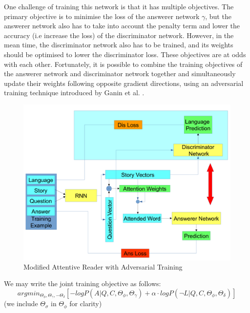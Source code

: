 \documentclass[]{article}
\begin{document}
One challenge of training this network is that it has multiple objectives. The primary objective is to minimise the loss of the answerer network $\gamma$, but the answerer network also has to take into account the penalty term and lower the accuracy (i.e increase the loss) of the discriminator network. However, in the mean time, the discriminator network also has to be trained, and its weights should be optimised to lower the discriminator loss. These objectives are at odds with each other. Fortunately, it is possible to combine the training objectives of the answerer network and discriminator network together and simultaneously update their weights following opposite gradient directions, using an adversarial training technique introduced by Ganin et al. \cite{ganin2016domain}.

\begin{center}
	\begin{figure}
		\includegraphics[width=\linewidth]{media/adversa.png}
		\caption{Modified Attentive Reader with Adversarial Training}
		\label{fig:adversa}
	\end{figure}
\end{center}


We may write the joint training objective as follows:
\[ argmin_{\Theta_\phi, \Theta_\gamma, -\Theta_\delta} [-logP(A|Q, C, \Theta_\phi, \Theta_\gamma) + \alpha \cdot log P(\lnot L|Q, C,\Theta_\phi, \Theta_\delta)] \]
(we include $\Theta_\sigma$ in $\Theta_\phi$ for clarity)
\end{document}
